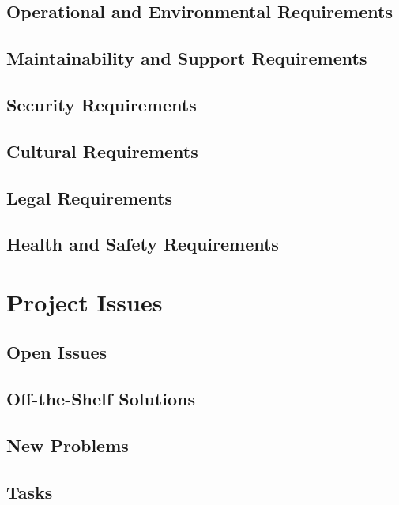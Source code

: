 \documentclass[11pt]{article}
\begin{document}
\subsection{Operational and Environmental Requirements}

\subsection{Maintainability and Support Requirements}

\subsection{Security Requirements}

\subsection{Cultural Requirements}

\subsection{Legal Requirements}

\subsection{Health and Safety Requirements}

\section{Project Issues}

\subsection{Open Issues}
\subsection{Off-the-Shelf Solutions}
\subsection{New Problems}
\subsection{Tasks}
\end{document}
